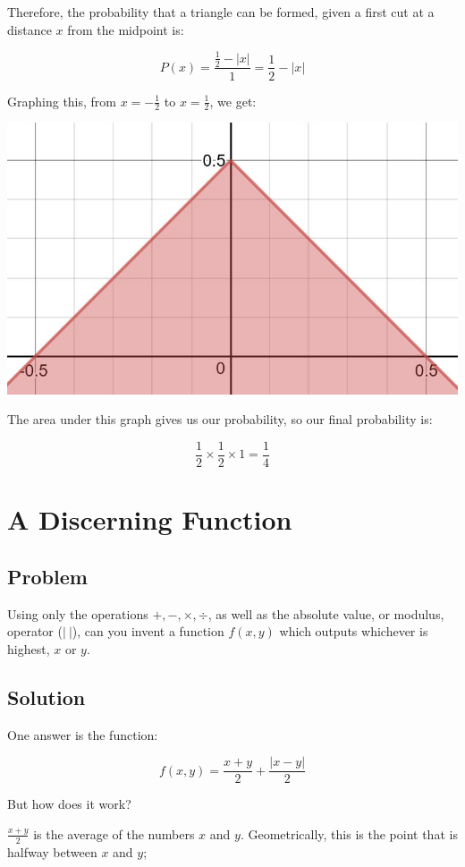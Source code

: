 \documentclass{book}
\begin{document}
Therefore, the probability that a triangle can be formed, given a first cut at a distance \(x\) from the midpoint is:

\[P(x)= \frac{\frac{1}{2}-|x|}{1}=\frac{1}{2}-|x|\]

Graphing this, from \(x=-\frac{1}{2}\) to \(x=\frac{1}{2}\), we get:

\begin{center}
\includegraphics{stick4}
\end{center}


The area under this graph gives us our probability, so our final probability is:

\[\frac{1}{2} \times \frac{1}{2} \times 1=\boxed{\frac{1}{4}}\]
\newpage

\section{A Discerning Function}
\subsection{Problem}
Using only the operations \(+, -, \times, \div\), as well as the absolute value, or modulus, operator (\(|\:|\)), can you invent a function \(f(x,y)\) which outputs whichever is highest, \(x\) or \(y\).

\subsection{Solution}
One answer is the function:

\[f(x,y)=\frac{x+y}{2}+\frac{|x-y|}{2}\]

But how does it work?

\(\frac{x+y}{2}\) is the average of the numbers \(x\) and \(y\). Geometrically, this is the point that is halfway between \(x\) and \(y\);
\end{document}
